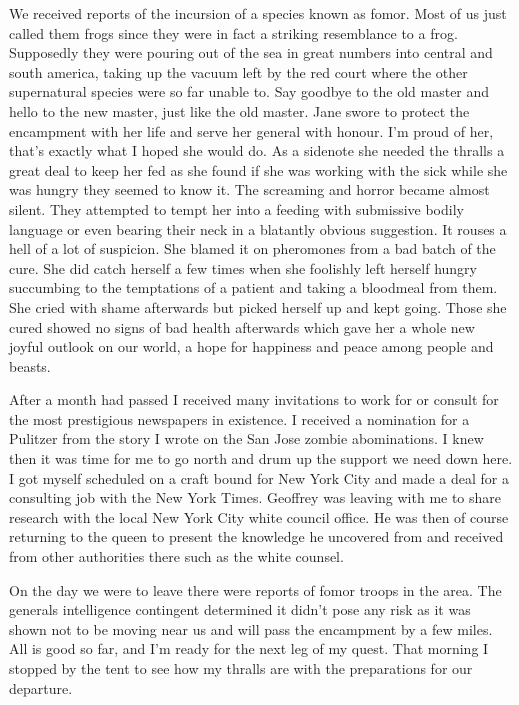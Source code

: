 We received reports of the incursion of a species known as fomor. Most of us just called them frogs since they were in fact a striking resemblance to a frog. Supposedly they were pouring out of the sea in great numbers into central and south america, taking up the vacuum left by the red court where the other supernatural species were so far unable to. Say goodbye to the old master and hello to the new master, just like the old master. Jane swore to protect the encampment with her life and serve her general with honour. I'm proud of her, that's exactly what I hoped she would do. As a sidenote she needed the thralls a great deal to keep her fed as she found if she was working with the sick while she was hungry they seemed to know it. The screaming and horror became almost silent. They attempted to tempt her into a feeding with submissive bodily language or even bearing their neck in a blatantly obvious suggestion. It rouses a hell of a lot of suspicion. She blamed it on pheromones from a bad batch of the cure. She did catch herself a few times when she foolishly left herself hungry succumbing to the temptations of a patient and taking a bloodmeal from them. She cried with shame afterwards but picked herself up and kept going. Those she cured showed no signs of bad health afterwards which gave her a whole new joyful outlook on our world, a hope for happiness and peace among people and beasts.

After a month had passed I received many invitations to work for or consult for the most prestigious newspapers in existence. I received a nomination for a Pulitzer from the story I wrote on the San Jose zombie abominations. I knew then it was time for me to go north and drum up the support we need down here. I got myself scheduled on a craft bound for New York City and made a deal for a consulting job with the New York Times. Geoffrey was leaving with me to share \chichenitza* research with the local New York City white council office. He was then of course returning to the queen to present the knowledge he uncovered from \chichenitza* and received from other authorities there such as the white counsel.

On the day we were to leave there were reports of fomor troops in the area. The generals intelligence contingent determined it didn't pose any risk as it was shown not to be moving near us and will pass the encampment by a few miles. All is good so far, and I'm ready for the next leg of my quest. That morning I stopped by the tent to see how my thralls are with the preparations for our departure.

